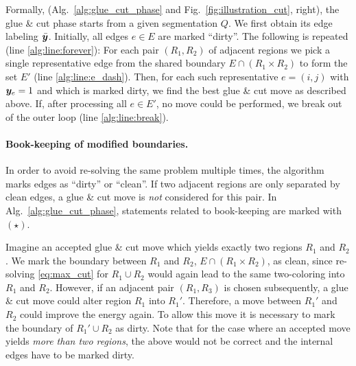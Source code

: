 Formally,
(Alg.~\ref{alg:glue_cut_phase} and Fig.~\ref{fig:illustration_cut}, right),
the glue \& cut phase starts from a given segmentation $Q$.
We first obtain its edge labeling $\bar{\boldsymbol y}$.
Initially, all edges $e\in E$ are marked ``dirty''.
%
The following is repeated (line \ref{alg:line:forever}):
%
For each pair $(R_1, R_2)$ of adjacent regions
we pick a single representative edge from the shared boundary 
$E\cap(R_1\times R_2)$ to form the set $E'$ (line \ref{alg:line:e_dash}). 
Then, for each such representative $e=(i,j)$ with $\boldsymbol y_e=1$ and which
is marked dirty, we find the best glue \& cut move as described above.
If, after processing all $e\in E'$, no move could be performed, we break
out of the outer loop (line \ref{alg:line:break}).

\paragraph{Book-keeping of modified boundaries.}
In order to avoid re-solving the same problem multiple times, the algorithm
marks edges as ``dirty'' or ``clean''. If two adjacent regions are only separated
by clean edges, a glue \& cut move is \emph{not} considered for this pair.
%
In Alg.~\ref{alg:glue_cut_phase}, statements related to book-keeping
are marked with $(\star)$.

Imagine an accepted glue \& cut move which yields exactly two regions
$R_1$ and $R_2$.
We mark the boundary between $R_1$ and $R_2$, $E\cap(R_1\times R_2)$, as clean,
since re-solving \eqref{eq:max_cut} for $R_1\cup R_2$
would again lead to the same two-coloring into $R_1$ and $R_2$.
%
However, if an adjacent pair $(R_1, R_3)$ is chosen subsequently, 
a glue \& cut move could alter
region $R_1$ into $R_1'$.
Therefore, a move between $R_1'$ and $R_2$ could improve the energy again.
To allow this move it is necessary to 
mark the boundary of $R_1' \cup R_2$ as dirty.
%
Note that for the case where an accepted move yields \emph{more than two regions},
the above would not be correct and the internal edges have to be marked dirty.
%






